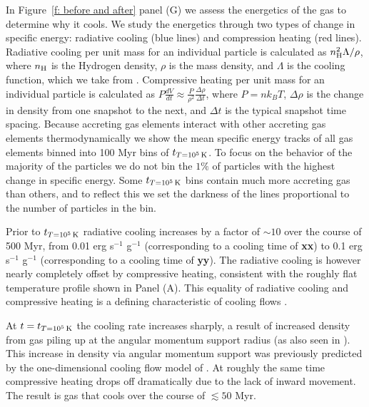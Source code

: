\documentclass[fleqn,usenatbib]{mnras}
\newcommand{\tcon}{t_{T=10^5\,{\rm K}}}
\newcommand{\nH}{n_{\rm H}}
\begin{document}
In Figure~\ref{f: before and after} panel (G) we assess the energetics of the gas to determine why it cools.
We study the energetics through two types of change in specific energy: radiative cooling (blue lines) and compression heating (red lines).
Radiative cooling per unit mass for an individual particle is calculated as $\nH^2 \Lambda / \rho$, where $\nH$ is the Hydrogen density, $\rho$ is the mass density, and $\Lambda$ is the cooling function, which we take from \cite{Wiersma2009a}.
Compressive heating per unit mass for an individual particle is calculated as $P \frac{dV}{dt} \approx \frac{ P }{ \rho^2 } \frac{ \Delta \rho }{ \Delta t }$, where $P = n k_B T$, $\Delta \rho$ is the change in density from one snapshot to the next, and $\Delta t$ is the typical snapshot time spacing.
Because accreting gas elements interact with other accreting gas elements thermodynamically we show the mean specific energy tracks of all gas elements binned into 100 Myr bins of $\tcon$.
To focus on the behavior of the majority of the particles we do not bin the $1\%$ of particles with the highest change in specific energy.
Some $\tcon$ bins contain much more accreting gas than others, and to reflect this we set the darkness of the lines proportional to the number of particles in the bin.

Prior to $\tcon$ radiative cooling increases by a factor of $\sim 10$ over the course of 500 Myr, from 0.01 erg s$^{-1}$ g$^{-1}$ (corresponding to a cooling time of \textbf{xx}) to 0.1 erg s$^{-1}$ g$^{-1}$ (corresponding to a cooling time of \textbf{yy}).
The radiative cooling is however nearly completely offset by compressive heating, consistent with the roughly flat temperature profile shown in Panel (A).
This equality of radiative cooling and compressive heating is a defining characteristic of cooling flows \citep{Mathews1978, McNamara2007, Stern2020}. 

At $t=\tcon$ the cooling rate increases sharply, a result of increased density from gas piling up at the angular momentum support radius (as also seen in \citealt{Trapp2021}).
This increase in density via angular momentum support was previously predicted by the one-dimensional cooling flow model of \cite{Cowie1980}.
At roughly the same time compressive heating drops off dramatically due to the lack of inward movement.
The result is gas that cools over the course of $\lesssim 50$ Myr.

\subsection{}
\end{document}
